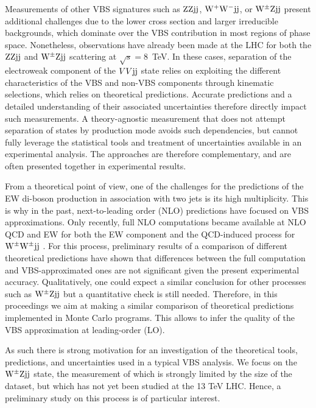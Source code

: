 \documentclass[11pt]{cernrep}
\begin{document}
Measurements of other VBS signatures such as ${\rm Z}{\rm Z}{\rm j}{\rm j}$, ${\rm W}^+{\rm W}^-{\rm j}{\rm j}$, or ${\rm W}^{\pm}{\rm Z}{\rm j}{\rm j}$ present additional challenges due to the lower cross section and larger irreducible backgrounds, which dominate over the VBS contribution in most regions of phase space.
Nonetheless, observations have already been made at the LHC for both the ${\rm Z}{\rm Z}{\rm j}{\rm j}$ \cite{Sirunyan:2017fvv} and ${\rm W}^{\pm}{\rm Z}{\rm j}{\rm j}$ \cite{Aad:2016ett} scattering at $\sqrt{s} = 8$~TeV.
In these cases, separation of the electroweak component of the $VV{\rm j}{\rm j}$ state relies on exploiting the different characteristics of the VBS and non-VBS
components through kinematic selections, which relies on theoretical predictions.
Accurate predictions and a detailed understanding of their associated uncertainties therefore directly impact such measurements.
A theory-agnostic measurement that does not attempt separation of states by production mode avoids such dependencies,
but cannot fully leverage the statistical tools and treatment of uncertainties available in an experimental analysis.
The approaches are therefore complementary, and are often presented together in experimental results.

From a theoretical point of view, one of the challenges for the predictions of the EW di-boson production in association with two jets is its high multiplicity.
This is why in the past, next-to-leading order (NLO) predictions have focused on VBS approximations.
Only recently, full NLO computations became available at NLO QCD and EW for both the EW component and the QCD-induced process for ${\rm W}^\pm{\rm W}^\pm{\rm j}{\rm j}$ \cite{Biedermann:2017bss}.
For this process, preliminary results \cite{Anders:2018gfr} of a comparison of different theoretical predictions have shown that differences between the full computation and VBS-approximated ones are not significant given the present experimental accuracy.
Qualitatively, one could expect a similar conclusion for other processes such as ${\rm W}^{\pm}{\rm Z}{\rm j}{\rm j}$ but a quantitative check is still needed.
Therefore, in this proceedings we aim at making a similar comparison of theoretical predictions implemented in Monte Carlo programs.
This allows to infer the quality of the VBS approximation at leading-order (LO).

As such there is strong motivation for an investigation of the theoretical tools, predictions, and uncertainties
used in a typical VBS analysis. 
We focus on the ${\rm W}^{\pm}{\rm Z}{\rm j}{\rm j}$ \cite{Aad:2016ett} state, the measurement of which is strongly limited by the size of the dataset, 
but which has not yet been studied at the 13 TeV LHC. Hence, a preliminary study on this process is of particular interest.
\end{document}
